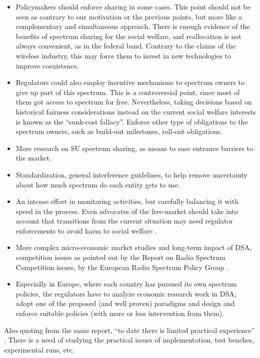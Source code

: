 \begin{itemize}
\item Policymakers should enforce sharing in some cases. This point should not be seen as contrary to our motivation or the previous points, but more like a complementary and simultaneous approach. There is enough evidence of the benefits of spectrum sharing for the social welfare, and reallocation is not always convenient, as in the federal band. Contrary to the claims of the wireless industry, this may force them to invest in new technologies to improve coexistence. 

\item Regulators could also employ incentive mechanisms to spectrum owners to give up part of this spectrum. This is a controversial point, since most of them got access to spectrum for free. Nevertheless, taking decisions based on historical fairness considerations instead on the current social welfare interests is known as the \enquote{sunk-cost fallacy}.
Enforce other type of obligations to the spectrum owners, such as build-out milestones, roll-out obligations.
\item More research on SU spectrum sharing, as means to ease entrance barriers to the market.
\item Standardization, general interference guidelines, to help remove uncertainty about how much spectrum do each entity gets to use.
\item An intense effort in monitoring activities, but carefully balancing it with speed in the process. Even advocates of the free-market should take into account that transitions from the current situation may need regulator enforcements to avoid harm to social welfare \cite{Yoon2012}. 
\item More complex micro-economic market studies and long-term impact of DSA, competition issues as pointed out by the Report on Radio Spectrum Competition issues, by the European Radio Spectrum Policy Group \cite{ref:RSPG2009}.
\item Especially in Europe, where each country has pursued its own spectrum policies, the regulators have to analyze economic research work in DSA, adopt one of the proposed (and well proven) paradigms and design and enforce suitable policies (with more or less intervention from them).
\end{itemize} 

Also quoting from the same report, \enquote{to date there is limited practical experience} \cite{ref:RSPG2009}. There is a need of studying the practical issues of implementation, test benches, experimental runs, etc. 

